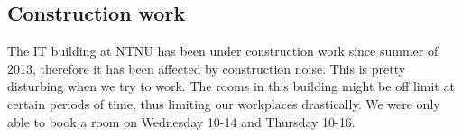 \subsection{Construction work}
The IT building at NTNU has been under construction work since summer of 2013, therefore it has been affected by construction noise. This is pretty disturbing when we try to work. The rooms in this building might be off limit at certain periods of time, thus limiting our workplaces drastically. We were only able to book a room on Wednesday 10-14 and Thursday 10-16.


